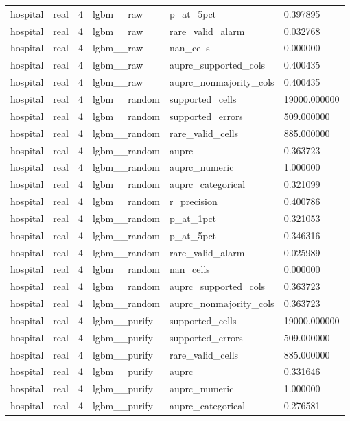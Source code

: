 \begin{tabular}{llllll}
hospital & real & 4 & lgbm\_\_raw & p\_at\_5pct & 0.397895 \\
hospital & real & 4 & lgbm\_\_raw & rare\_valid\_alarm & 0.032768 \\
hospital & real & 4 & lgbm\_\_raw & nan\_cells & 0.000000 \\
hospital & real & 4 & lgbm\_\_raw & auprc\_supported\_cols & 0.400435 \\
hospital & real & 4 & lgbm\_\_raw & auprc\_nonmajority\_cols & 0.400435 \\
hospital & real & 4 & lgbm\_\_random & supported\_cells & 19000.000000 \\
hospital & real & 4 & lgbm\_\_random & supported\_errors & 509.000000 \\
hospital & real & 4 & lgbm\_\_random & rare\_valid\_cells & 885.000000 \\
hospital & real & 4 & lgbm\_\_random & auprc & 0.363723 \\
hospital & real & 4 & lgbm\_\_random & auprc\_numeric & 1.000000 \\
hospital & real & 4 & lgbm\_\_random & auprc\_categorical & 0.321099 \\
hospital & real & 4 & lgbm\_\_random & r\_precision & 0.400786 \\
hospital & real & 4 & lgbm\_\_random & p\_at\_1pct & 0.321053 \\
hospital & real & 4 & lgbm\_\_random & p\_at\_5pct & 0.346316 \\
hospital & real & 4 & lgbm\_\_random & rare\_valid\_alarm & 0.025989 \\
hospital & real & 4 & lgbm\_\_random & nan\_cells & 0.000000 \\
hospital & real & 4 & lgbm\_\_random & auprc\_supported\_cols & 0.363723 \\
hospital & real & 4 & lgbm\_\_random & auprc\_nonmajority\_cols & 0.363723 \\
hospital & real & 4 & lgbm\_\_purify & supported\_cells & 19000.000000 \\
hospital & real & 4 & lgbm\_\_purify & supported\_errors & 509.000000 \\
hospital & real & 4 & lgbm\_\_purify & rare\_valid\_cells & 885.000000 \\
hospital & real & 4 & lgbm\_\_purify & auprc & 0.331646 \\
hospital & real & 4 & lgbm\_\_purify & auprc\_numeric & 1.000000 \\
hospital & real & 4 & lgbm\_\_purify & auprc\_categorical & 0.276581 \\

\end{tabular}
